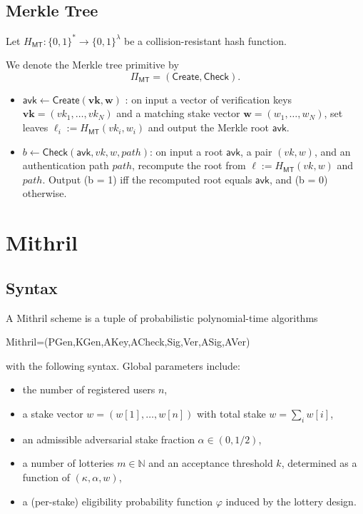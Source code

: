 \documentclass{article}
\begin{document}
\subsection{Merkle Tree}
Let $H_{\mathsf{MT}}  : \{0,1\}^* \to \{0,1\}^\lambda$ be a collision-resistant hash function.

We denote the Merkle tree primitive by
\[
\Pi_{\mathsf{MT}} = (\mathsf{Create}, \mathsf{Check}).
\]

\begin{itemize}

    \item $\mathsf{avk} \leftarrow \mathsf{Create}(\mathbf{vk}, \mathbf{w})$ : 
    on input a vector of verification keys $\mathbf{vk} = (vk_1,\dots,vk_N)$ and a matching stake vector $\mathbf{w}=(w_1,\dots,w_N)$, set leaves $\ell_i := H_{\mathsf{MT}} (vk_i , w_i)$ and output the Merkle root $\mathsf{avk}$.
    
    \item $b \leftarrow \mathsf{Check}(\mathsf{avk}, vk, w, path)$: on input a root $\mathsf{avk}$, a pair $(vk,w)$, and an authentication path $path$, recompute the root from $\ell := H_{\mathsf{MT}} (vk , w)$ and $path$. Output (b = 1) iff the recomputed root equals $\mathsf{avk}$, and (b = 0) otherwise.

\end{itemize}




\section{Mithril}

\subsection{Syntax}
A Mithril scheme is a tuple of probabilistic polynomial-time algorithms

Mithril=(PGen,KGen,AKey,ACheck,Sig,Ver,ASig,AVer)



with the following syntax. Global parameters include: \begin{itemize} \item the number of registered users $n$, \item a stake vector $w = (w[1],\dots,w[n])$ with total stake $w = \sum_i w[i]$, \item an admissible adversarial stake fraction $\alpha \in (0, 1/2)$, \item a number of lotteries $m \in \mathbb{N}$ and an acceptance threshold $k$, determined as a function of $(\kappa, \alpha, w)$, \item a (per-stake) eligibility probability function $\varphi$ induced by the lottery design. \end{itemize}
\end{document}
